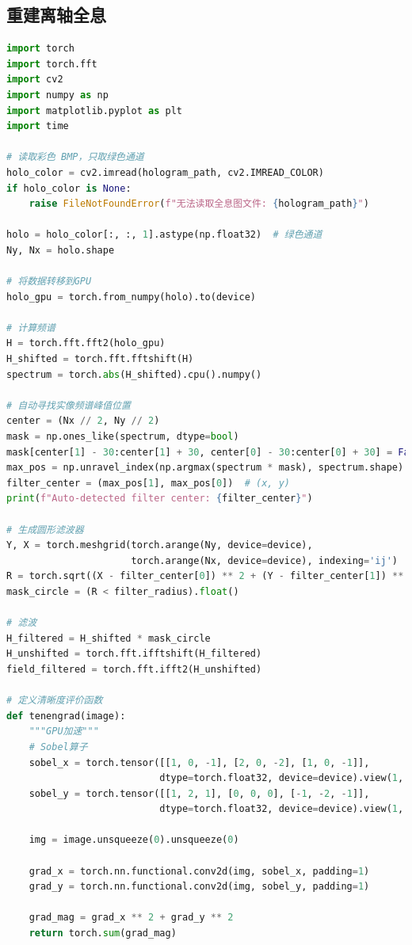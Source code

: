 \documentclass[a4paper,draft]{report}
\begin{document}
\subsection{重建离轴全息}
\begin{lstlisting}[language=Python, caption=离轴全息重建, label=code:generator]
import torch
import torch.fft
import cv2
import numpy as np
import matplotlib.pyplot as plt
import time

# 读取彩色 BMP，只取绿色通道
holo_color = cv2.imread(hologram_path, cv2.IMREAD_COLOR)
if holo_color is None:
    raise FileNotFoundError(f"无法读取全息图文件: {hologram_path}")

holo = holo_color[:, :, 1].astype(np.float32)  # 绿色通道
Ny, Nx = holo.shape

# 将数据转移到GPU
holo_gpu = torch.from_numpy(holo).to(device)

# 计算频谱
H = torch.fft.fft2(holo_gpu)
H_shifted = torch.fft.fftshift(H)
spectrum = torch.abs(H_shifted).cpu().numpy()

# 自动寻找实像频谱峰值位置
center = (Nx // 2, Ny // 2)
mask = np.ones_like(spectrum, dtype=bool)
mask[center[1] - 30:center[1] + 30, center[0] - 30:center[0] + 30] = False
max_pos = np.unravel_index(np.argmax(spectrum * mask), spectrum.shape)
filter_center = (max_pos[1], max_pos[0])  # (x, y)
print(f"Auto-detected filter center: {filter_center}")

# 生成圆形滤波器
Y, X = torch.meshgrid(torch.arange(Ny, device=device),
                      torch.arange(Nx, device=device), indexing='ij')
R = torch.sqrt((X - filter_center[0]) ** 2 + (Y - filter_center[1]) ** 2)
mask_circle = (R < filter_radius).float()

# 滤波
H_filtered = H_shifted * mask_circle
H_unshifted = torch.fft.ifftshift(H_filtered)
field_filtered = torch.fft.ifft2(H_unshifted)

# 定义清晰度评价函数
def tenengrad(image):
    """GPU加速"""
    # Sobel算子
    sobel_x = torch.tensor([[1, 0, -1], [2, 0, -2], [1, 0, -1]],
                           dtype=torch.float32, device=device).view(1, 1, 3, 3)
    sobel_y = torch.tensor([[1, 2, 1], [0, 0, 0], [-1, -2, -1]],
                           dtype=torch.float32, device=device).view(1, 1, 3, 3)

    img = image.unsqueeze(0).unsqueeze(0)

    grad_x = torch.nn.functional.conv2d(img, sobel_x, padding=1)
    grad_y = torch.nn.functional.conv2d(img, sobel_y, padding=1)

    grad_mag = grad_x ** 2 + grad_y ** 2
    return torch.sum(grad_mag)


\end{lstlisting}
\end{document}
